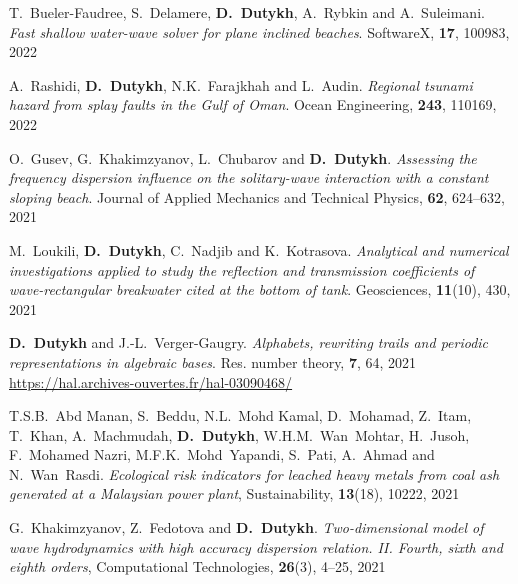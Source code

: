 \begin{etaremune}
  \item T.~Bueler-Faudree, S.~Delamere, \textbf{D.~Dutykh}, A.~Rybkin and A.~Suleimani. \textit{Fast shallow water-wave solver for plane inclined beaches}. SoftwareX, \textbf{17}, 100983, 2022 %
  
  \item A.~Rashidi, \textbf{D.~Dutykh}, N.K.~Farajkhah and L.~Audin. \textit{Regional tsunami hazard from splay faults in the Gulf of Oman}. Ocean Engineering, \textbf{243}, 110169, 2022 %

  
  \item O.~Gusev, G.~Khakimzyanov, L.~Chubarov and \textbf{D.~Dutykh}. \textit{Assessing the frequency dispersion influence on the solitary-wave interaction with a constant sloping beach}. Journal of Applied Mechanics and Technical Physics, \textbf{62}, 624--632, 2021 %
  
  \item M.~Loukili, \textbf{D.~Dutykh}, C.~Nadjib and K.~Kotrasova. \textit{Analytical and numerical investigations applied to study the reflection and transmission coefficients of wave-rectangular breakwater cited at the bottom of tank}. Geosciences, \textbf{11}(10), 430, 2021 %
  
  \item \textbf{D.~Dutykh} and J.-L.~Verger-Gaugry. \textit{Alphabets, rewriting trails and periodic representations in algebraic bases}. Res. number theory, \textbf{7}, 64, 2021 \\ %
  \url{https://hal.archives-ouvertes.fr/hal-03090468/}
  
  \item T.S.B.~Abd Manan, S.~Beddu, N.L.~Mohd Kamal, D.~Mohamad, Z.~Itam, T.~Khan, A.~Machmudah, \textbf{D.~Dutykh}, W.H.M.~Wan~Mohtar, H.~Jusoh, F.~Mohamed Nazri, M.F.K.~Mohd~Yapandi, S.~Pati, A.~Ahmad and N.~Wan~Rasdi. \textit{Ecological risk indicators for leached heavy metals from coal ash generated at a Malaysian power plant}, Sustainability, \textbf{13}(18), 10222, 2021 %
  
  \item G.~Khakimzyanov, Z.~Fedotova and \textbf{D.~Dutykh}. \textit{Two-dimensional model of wave hydrodynamics with high accuracy dispersion relation. II. Fourth, sixth and eighth orders}, Computational Technologies, \textbf{26}(3), 4--25, 2021 %
  

\end{etaremune}
